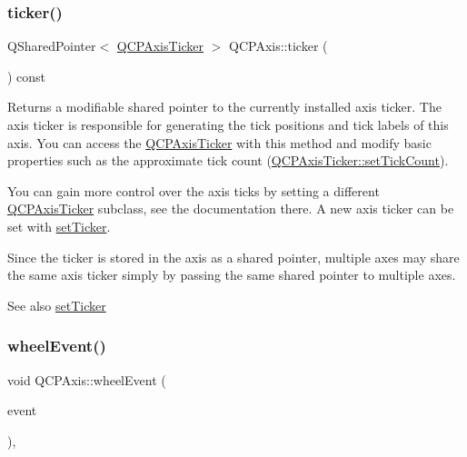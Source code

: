 \subsubsection{\texorpdfstring{ticker()}{ticker()}}
{\footnotesize\ttfamily Q\+Shared\+Pointer$<$ \hyperlink{classQCPAxisTicker}{Q\+C\+P\+Axis\+Ticker} $>$ Q\+C\+P\+Axis\+::ticker (\begin{DoxyParamCaption}{ }\end{DoxyParamCaption}) const\hspace{0.3cm}{\ttfamily [inline]}}

Returns a modifiable shared pointer to the currently installed axis ticker. The axis ticker is responsible for generating the tick positions and tick labels of this axis. You can access the \hyperlink{classQCPAxisTicker}{Q\+C\+P\+Axis\+Ticker} with this method and modify basic properties such as the approximate tick count (\hyperlink{classQCPAxisTicker_a47752abba8293e6dc18491501ae34008}{Q\+C\+P\+Axis\+Ticker\+::set\+Tick\+Count}).

You can gain more control over the axis ticks by setting a different \hyperlink{classQCPAxisTicker}{Q\+C\+P\+Axis\+Ticker} subclass, see the documentation there. A new axis ticker can be set with \hyperlink{classQCPAxis_a4ee03fcd2c74d05cd1a419b9af5cfbdc}{set\+Ticker}.

Since the ticker is stored in the axis as a shared pointer, multiple axes may share the same axis ticker simply by passing the same shared pointer to multiple axes.

\begin{DoxySeeAlso}{See also}
\hyperlink{classQCPAxis_a4ee03fcd2c74d05cd1a419b9af5cfbdc}{set\+Ticker} 
\end{DoxySeeAlso}
\mbox{\label{classQCPAxis_aa850f195d7cc470c53809d0fff5e444d}} 
\subsubsection{\texorpdfstring{wheel\+Event()}{wheelEvent()}}
{\footnotesize\ttfamily void Q\+C\+P\+Axis\+::wheel\+Event (\begin{DoxyParamCaption}\item[{Q\+Wheel\+Event $\ast$}]{event }\end{DoxyParamCaption})\hspace{0.3cm}{\ttfamily [protected]}, {\ttfamily [virtual]}}

